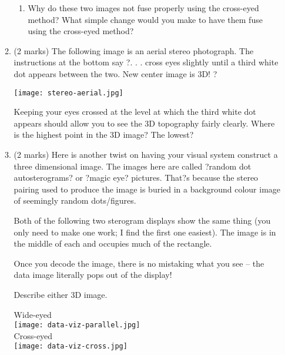 \documentclass[12]{article}
\begin{document}
\begin{enumerate}
\begin{enumerate}
\begin{enumerate}
\item Why do these two images not fuse properly using the cross-eyed method?  What simple change would you make to have them fuse using the cross-eyed method? 

\end{enumerate}

\item (2 marks) The following image is an aerial stereo photograph. The instructions at the bottom say
?. . . cross eyes slightly until a third white dot appears between the two.
New center image is 3D! ?
\begin{center}
\texttt{[image: stereo-aerial.jpg]} 
\end{center}
Keeping your eyes crossed at the level at which the third white dot appears should allow you to see the 3D
topography fairly clearly.
Where is the highest point in the 3D image?  The lowest?


\item (2 marks) Here is another twist on having your visual system construct a three dimensional image.  The images here are called ?random dot autosterograms? or ?magic eye? pictures. That?s because
the stereo pairing used to produce the image is buried in a background colour image of seemingly random
dots/figures.

Both of the following two sterogram displays show the same thing (you only need to make one work; I
find the first one easiest). The image is in the middle of each and occupies much of the rectangle.

Once you decode the image, there is no mistaking what you see -- the data image literally pops out of the
display!

\vspace{0.05 \textheight}
Describe either 3D image.


\begin{center}
Wide-eyed \\
\texttt{[image: data-viz-parallel.jpg]} \\

\vspace{0.05 \textheight}
Cross-eyed \\
\texttt{[image: data-viz-cross.jpg]} 
\end{center}
\end{enumerate}


\end{enumerate}
\end{document}
